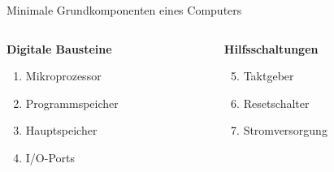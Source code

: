 \begin{frame}{Minimale Grundkomponenten eines Computers}
{        \medskip

        \begin{columns}
            \begin{column}[T]{.5\textwidth}
                \textbf{Digitale Bausteine}
                \begin{enumerate}
                    \item Mikroprozessor
                    \item Programmspeicher
                    \item Hauptspeicher
                    \item I/O-Ports
                \end{enumerate}
            \end{column}
            \begin{column}[T]{.5\textwidth}
                \textbf{Hilfsschaltungen}
                \begin{enumerate}
                    \setcounter{enumi}{4}
                    \item Taktgeber
                    \item Resetschalter
                    \item Stromversorgung
                \end{enumerate}
            \end{column}
        \end{columns}
    }
\end{frame}

